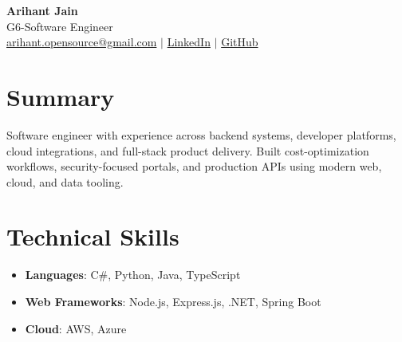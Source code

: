 \documentclass[11pt,a4paper]{article}
\begin{document}
\begin{center}
{\LARGE \textbf{Arihant Jain}}
\\ G6-Software Engineer
\\ \href{mailto:arihant.opensource@gmail.com}{arihant.opensource@gmail.com} $\mid$ \href{https://linkedin.com/in/arihantjain1208}{LinkedIn} $\mid$ \href{https://github.com/Arihant1208}{GitHub}
\end{center}

\section{Summary}
Software engineer with experience across backend systems, developer platforms, cloud integrations, and full-stack product delivery. Built cost-optimization workflows, security-focused portals, and production APIs using modern web, cloud, and data tooling.

\section{Technical Skills}
\begin{itemize}
  \item \textbf{Languages}: C\#, Python, Java, TypeScript
  \item \textbf{Web Frameworks}: Node.js, Express.js, .NET, Spring Boot
  \item \textbf{Cloud}: AWS, Azure
\end{itemize}
\end{document}
